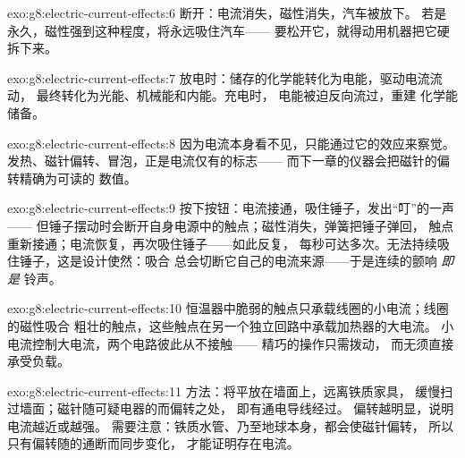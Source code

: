 \begin{solution}{exo:g8:electric-current-effects:6}
断开：电流消失，磁性消失，汽车被放下。
若是永久，磁性强到这种程度，将永远吸住汽车——
要松开它，就得动用机器把它硬拆下来。
\end{solution}

\begin{solution}{exo:g8:electric-current-effects:7}
放电时：储存的化学能转化为电能，驱动电流流动，
最终转化为光能、机械能和内能。充电时，
电能被迫反向流过，重建
化学能储备。
\end{solution}

\begin{solution}{exo:g8:electric-current-effects:8}
因为电流本身看不见，只能通过它的效应来察觉。
发热、磁针偏转、冒泡，正是电流仅有的标志——
而下一章的仪器会把磁针的偏转精确为可读的
数值。
\end{solution}

\begin{solution}{exo:g8:electric-current-effects:9}
按下按钮：电流接通，吸住锤子，发出“叮”的一声——
但锤子摆动时会断开自身电源中的触点；磁性消失，弹簧把锤子弹回，
触点重新接通；电流恢复，再次吸住锤子——如此反复，
每秒可达多次。无法持续吸住锤子，这是设计使然：吸合
总会切断它自己的电流来源——于是连续的颤响
\emph{即是}
铃声。
\end{solution}

\begin{solution}{exo:g8:electric-current-effects:10}
恒温器中脆弱的触点只承载线圈的小电流；线圈的磁性吸合
粗壮的触点，这些触点在另一个独立回路中承载加热器的大电流。
小电流控制大电流，两个电路彼此从不接触——
精巧的操作只需拨动，
而无须直接承受负载。
\end{solution}

\begin{solution}{exo:g8:electric-current-effects:11}
方法：将平放在墙面上，远离铁质家具，
缓慢扫过墙面；磁针随可疑电器的而偏转之处，
即有通电导线经过。
偏转越明显，说明电流越近或越强。
需要注意：铁质水管、乃至地球本身，都会使磁针偏转，
所以只有偏转随的通断而同步变化，
才能证明存在电流。
\end{solution}

